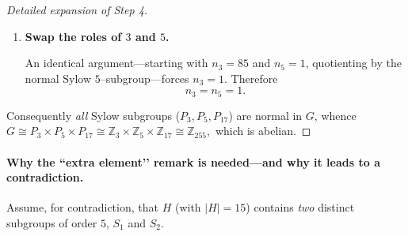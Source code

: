 \documentclass[12pt]{article}
\theoremstyle{definition} %
\theoremstyle{plain} %
\begin{document}
\begin{proof}[Detailed expansion of Step 4]
\begin{enumerate}
  Consequently $H$ would have at least $9+2 = 11$ distinct non-identity
  elements, plus the identity, totalling at least $12$, which forces
  $|H|\ge12$.  However $|H|=15$, and \emph{any} additional element of
  order $5$ or $3$ would push the count past $15$, contradicting the fixed
  order.  Therefore only \emph{one} subgroup of order $5$ can exist in $H$.
  
  \bigskip
  Either route yields the desired uniqueness; in particular
  \[
      n_{5}=1,
  \]
  contradicting the earlier assumption $n_{5}=51$ and completing Step 6.
  \item \textbf{Swap the roles of $3$ and $5$.}
  
        An identical argument—starting with $n_{3}=85$ and $n_{5}=1$,
        quotienting by the normal Sylow $5$–subgroup—forces $n_{3}=1$.
        Therefore
        $$
            n_{3}=n_{5}=1.
        $$
  
  \end{enumerate}
  
  Consequently \emph{all} Sylow subgroups ($P_{3},P_{5},P_{17}$) are
  normal in $G$, whence
  $
      G\cong P_{3}\times P_{5}\times P_{17}
            \cong\mathbb{Z}_{3}\times\mathbb{Z}_{5}\times\mathbb{Z}_{17}
            \cong\mathbb{Z}_{255},
  $
  which is abelian.
  \end{proof}
  \paragraph{Why the “extra element’’ remark is needed—and why it leads to a contradiction.}

Assume, for contradiction, that \(H\) (with \(|H|=15\)) contains
\emph{two} distinct subgroups of order \(5\),
\(S_{1}\) and \(S_{2}\).
\end{document}
